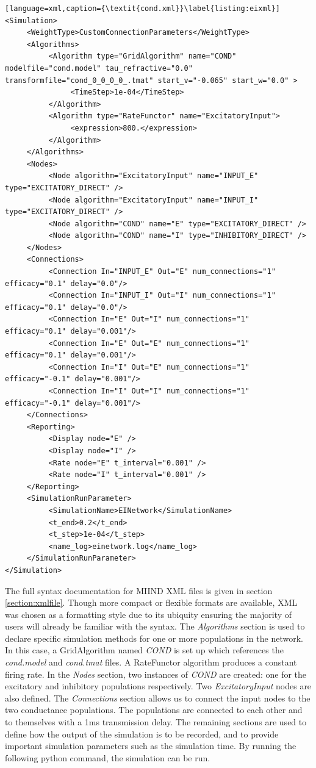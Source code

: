 \documentclass[utf8]{frontiersSCNS} %
\begin{document}
\begin{lstlisting}[language=xml,caption={\textit{cond.xml}}\label{listing:eixml}]
<Simulation>
     <WeightType>CustomConnectionParameters</WeightType>
     <Algorithms>
          <Algorithm type="GridAlgorithm" name="COND" modelfile="cond.model" tau_refractive="0.0" transformfile="cond_0_0_0_0_.tmat" start_v="-0.065" start_w="0.0" >
               <TimeStep>1e-04</TimeStep>
          </Algorithm>
		  <Algorithm type="RateFunctor" name="ExcitatoryInput">
			   <expression>800.</expression>
		  </Algorithm>
     </Algorithms>
     <Nodes>
		  <Node algorithm="ExcitatoryInput" name="INPUT_E" type="EXCITATORY_DIRECT" />
		  <Node algorithm="ExcitatoryInput" name="INPUT_I" type="EXCITATORY_DIRECT" />
          <Node algorithm="COND" name="E" type="EXCITATORY_DIRECT" />
          <Node algorithm="COND" name="I" type="INHIBITORY_DIRECT" />
     </Nodes>
     <Connections>
		  <Connection In="INPUT_E" Out="E" num_connections="1" efficacy="0.1" delay="0.0"/>
		  <Connection In="INPUT_I" Out="I" num_connections="1" efficacy="0.1" delay="0.0"/>
          <Connection In="E" Out="I" num_connections="1" efficacy="0.1" delay="0.001"/>
          <Connection In="E" Out="E" num_connections="1" efficacy="0.1" delay="0.001"/>
          <Connection In="I" Out="E" num_connections="1" efficacy="-0.1" delay="0.001"/>
          <Connection In="I" Out="I" num_connections="1" efficacy="-0.1" delay="0.001"/>
     </Connections>
     <Reporting>
          <Display node="E" />
          <Display node="I" />
          <Rate node="E" t_interval="0.001" />
          <Rate node="I" t_interval="0.001" />
     </Reporting>
     <SimulationRunParameter>
          <SimulationName>EINetwork</SimulationName>
          <t_end>0.2</t_end>
          <t_step>1e-04</t_step>
          <name_log>einetwork.log</name_log>
     </SimulationRunParameter>
</Simulation>
\end{lstlisting}

The full syntax documentation for MIIND XML files is given in section \ref{section:xmlfile}. Though more compact or flexible formats are available, XML was chosen as a formatting style due to its ubiquity ensuring the majority of users will already be familiar with the syntax. The \textit{Algorithms} section is used to declare specific simulation methods for one or more populations in the network. In this case, a GridAlgorithm named \textit{COND} is set up which references the \textit{cond.model} and \textit{cond.tmat} files. A RateFunctor algorithm produces a constant firing rate. In the \textit{Nodes} section, two instances of \textit{COND} are created: one for the excitatory and inhibitory populations respectively. Two \textit{ExcitatoryInput} nodes are also defined. The \textit{Connections} section allows us to connect the input nodes to the two conductance populations. The populations are connected to each other and to themselves with a 1ms transmission delay. The remaining sections are used to define how the output of the simulation is to be recorded, and to provide important simulation parameters such as the simulation time. By running the following python command, the simulation can be run.
\end{document}
